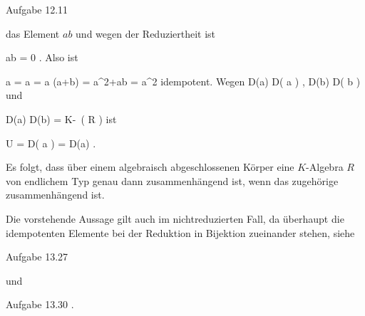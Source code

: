 {{Aufgabe 12.11

das Element $ab$
und wegen der Reduziertheit ist

\mavergleichskette
{\vergleichskette
{ ab
}
{ = }{ 0
}
{  }{
}
{    }{
}
{   }{
}
}
{}{}{.}
Also ist

\mavergleichskettedisp
{\vergleichskette
{ a
}
{ =} { a 
}
{ =} { a (a+b)
}
{ =} { a^2+ab
}
{ =} { a^2
}
}
{}{}{}
idempotent. Wegen
\mathkor {} {D(a) \subseteq D( {\mathfrak a} )} {,} {D(b) \subseteq D( {\mathfrak b} )} {}
und

\mavergleichskette
{\vergleichskette
{ D(a) \cup D(b)
}
{ = }{ K\!-\!\, \left(   R   \right)
}
{  }{
}
{    }{
}
{   }{
}
}
{}{}{}
ist

\mavergleichskette
{\vergleichskette
{ U
}
{ = }{ D( {\mathfrak a} )
}
{ = }{ D(a)
}
{    }{
}
{   }{
}
}
{}{}{.}}
{}




}



Es folgt, dass über einem algebraisch abgeschlossenen Körper eine
$K$-Algebra $R$ von endlichem Typ genau dann zusammenhängend ist, wenn das zugehörige
 zusammenhängend ist.

Die vorstehende Aussage gilt auch im nichtreduzierten Fall, da überhaupt die idempotenten Elemente bei der Reduktion in Bijektion zueinander stehen, siehe

Aufgabe 13.27

und

Aufgabe 13.30
.
